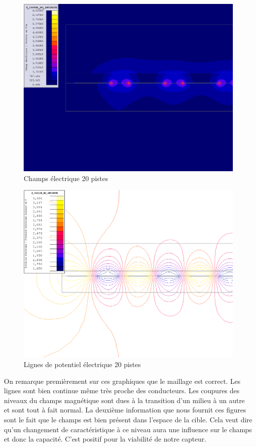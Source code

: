 \begin{figure}[!ht]
 \centering
 \includegraphics[width=14cm]{simulationChampElectrique.png}
 \caption{Champs électrique 20 pistes}
\end{figure}

\newpage
\begin{figure}[!ht]
 \centering
 \includegraphics[width=14cm]{C20air.png}
 \caption{Lignes de potentiel électrique 20 pistes}
\end{figure}

On remarque premièrement sur ces graphiques que le maillage est correct. Les lignes sont bien continue même très proche des conducteurs. Les coupures des niveaux du champs magnétique sont dues à la transition d'un milieu à un autre et sont tout à fait normal. La deuxième information que nous fournit ces figures sont le fait que le champs est bien présent dans l'espace de la cible. Cela veut dire qu'un changement de caractéristique à ce niveau aura une influence sur le champs et donc la capacité. C'est positif pour la viabilité de notre capteur.

